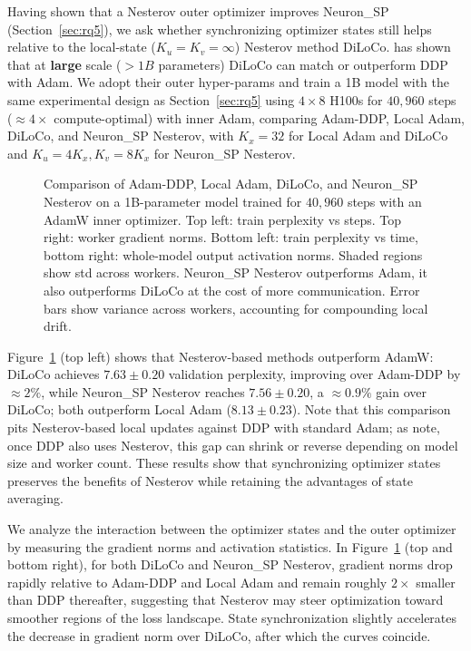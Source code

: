 \documentclass{article}
\begin{document}
Having shown that a Nesterov outer optimizer improves Neuron\_SP (Section~\ref{sec:rq5}), we ask whether synchronizing optimizer states still helps relative to the local-state ($K_u=K_v=\infty$) Nesterov method DiLoCo. \citet{charles2025convergence} has shown that at \textbf{large} scale ($>1B$ parameters) DiLoCo can match or outperform DDP with Adam. We adopt their outer hyper-params and train a 1B model with the same experimental design as Section~\ref{sec:rq5} using $4\times 8$ H100s for $40{,}960$ steps ($\approx 4\times$ compute-optimal) with inner Adam, comparing Adam-DDP, Local Adam, DiLoCo, and Neuron\_SP Nesterov, with $K_x=32$ for Local Adam and DiLoCo and $K_u=4K_x, K_v=8K_x$ for Neuron\_SP Nesterov.

\begin{figure}[t]
\centering
\caption{Comparison of Adam-DDP, Local Adam, DiLoCo, and Neuron\_SP Nesterov on a 1B-parameter model trained for $40{,}960$ steps with an AdamW inner optimizer. Top left: train perplexity vs steps. Top right: worker gradient norms. Bottom left: train perplexity vs time, bottom right: whole-model output activation norms. Shaded regions show std across workers. Neuron\_SP Nesterov outperforms Adam, it also outperforms DiLoCo at the cost of more communication. Error bars show variance across workers, accounting for compounding local drift.}
\label{fig:nesterov_diloco_1b}
\end{figure}

Figure~\ref{fig:nesterov_diloco_1b} (top left) shows that Nesterov-based methods outperform AdamW: DiLoCo achieves $7.63\pm 0.20$ validation perplexity, improving over Adam-DDP by $\approx 2\%$, while Neuron\_SP Nesterov reaches $7.56\pm 0.20$, a $\approx 0.9\%$ gain over DiLoCo; both outperform Local Adam ($8.13\pm 0.23$). Note that this comparison pits Nesterov-based local updates against DDP with standard Adam; as \citet{charles2025convergence} note, once DDP also uses Nesterov, this gap can shrink or reverse depending on model size and worker count. These results show that synchronizing optimizer states preserves the benefits of Nesterov while retaining the advantages of state averaging.

We analyze the interaction between the optimizer states and the outer optimizer by measuring the gradient norms and activation statistics. In Figure~\ref{fig:nesterov_diloco_1b} (top and bottom right), for both DiLoCo and Neuron\_SP Nesterov, gradient norms drop rapidly relative to Adam-DDP and Local Adam and remain roughly $2\times$ smaller than DDP thereafter, suggesting that Nesterov may steer optimization toward smoother regions of the loss landscape. State synchronization slightly accelerates the decrease in gradient norm over DiLoCo, after which the curves coincide.
\end{document}

